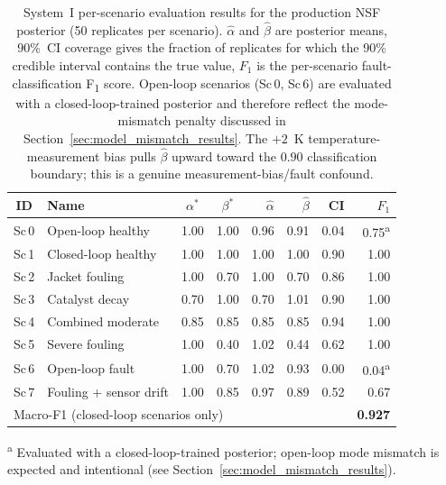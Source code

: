 \documentclass[aps,pre,twocolumn,superscriptaddress,floatfix]{revtex4-2}
\begin{document}
\begin{table}[tb]
\centering
\caption{System~I per-scenario evaluation results for the production NSF
  posterior (50 replicates per scenario).  $\hat{\alpha}$
  and $\hat{\beta}$ are posterior means, 90\%~CI coverage gives the
  fraction of replicates for which the 90\% credible interval contains
  the true value, $F_1$ is the per-scenario fault-classification F\textsubscript{1}
  score.  Open-loop scenarios (Sc\,0, Sc\,6) are evaluated with a
  closed-loop-trained posterior and therefore reflect the mode-mismatch
  penalty discussed in Section~\ref{sec:model_mismatch_results}. 
  The $+2$~K temperature-measurement bias pulls $\hat\beta$ upward toward the
  $0.90$ classification boundary; this is a genuine measurement-bias/fault confound.}
\label{tab:scenario_results}
\small
\begin{tabular}{clccrrrr}
\toprule
ID & Name & $\alpha^*$ & $\beta^*$ &
$\hat{\alpha}$ & $\hat{\beta}$ & CI %
& $F_1$ \\
\midrule
Sc\,0 & Open-loop healthy     & 1.00 & 1.00 & 0.96 & 0.91 & 0.04 & 0.75\textsuperscript{a} \\
Sc\,1 & Closed-loop healthy   & 1.00 & 1.00 & 1.00 & 1.00 & 0.90 & 1.00 \\
Sc\,2 & Jacket fouling        & 1.00 & 0.70 & 1.00 & 0.70 & 0.86 & 1.00 \\
Sc\,3 & Catalyst decay        & 0.70 & 1.00 & 0.70 & 1.01 & 0.90 & 1.00 \\
Sc\,4 & Combined moderate     & 0.85 & 0.85 & 0.85 & 0.85 & 0.94 & 1.00 \\
Sc\,5 & Severe fouling        & 1.00 & 0.40 & 1.02 & 0.44 & 0.62 & 1.00 \\
Sc\,6 & Open-loop fault       & 1.00 & 0.70 & 1.02 & 0.93 & 0.00 & 0.04\textsuperscript{a} \\
Sc\,7 & Fouling + sensor drift  & 1.00 & 0.85 & 0.97 & 0.89 & 0.52 & 0.67 \\
\midrule
\multicolumn{7}{l}{Macro-F1 (closed-loop scenarios only)} & \textbf{0.927} \\
\bottomrule
\end{tabular}
\begin{flushleft}
\textsuperscript{a} Evaluated with a closed-loop-trained posterior; open-loop
  mode mismatch is expected and intentional (see Section~\ref{sec:model_mismatch_results}).
\end{flushleft}
\end{table}
\end{document}
